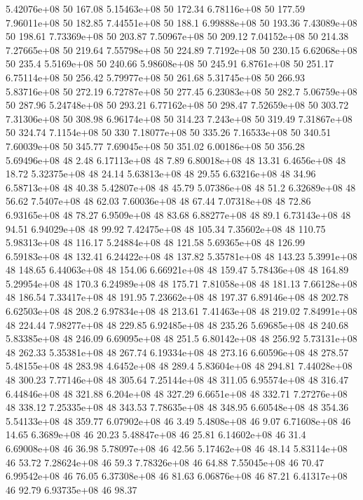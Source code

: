 5.42076e+08 50 167.08
5.15463e+08 50 172.34
6.78116e+08 50 177.59
7.96011e+08 50 182.85
7.44551e+08 50 188.1
6.99888e+08 50 193.36
7.43089e+08 50 198.61
7.73369e+08 50 203.87
7.50967e+08 50 209.12
7.04152e+08 50 214.38
7.27665e+08 50 219.64
7.55798e+08 50 224.89
7.7192e+08 50 230.15
6.62068e+08 50 235.4
5.5169e+08 50 240.66
5.98608e+08 50 245.91
6.8761e+08 50 251.17
6.75114e+08 50 256.42
5.79977e+08 50 261.68
5.31745e+08 50 266.93
5.83716e+08 50 272.19
6.72787e+08 50 277.45
6.23083e+08 50 282.7
5.06759e+08 50 287.96
5.24748e+08 50 293.21
6.77162e+08 50 298.47
7.52659e+08 50 303.72
7.31306e+08 50 308.98
6.96174e+08 50 314.23
7.243e+08 50 319.49
7.31867e+08 50 324.74
7.1154e+08 50 330
7.18077e+08 50 335.26
7.16533e+08 50 340.51
7.60039e+08 50 345.77
7.69045e+08 50 351.02
6.00186e+08 50 356.28
5.69496e+08 48 2.48
6.17113e+08 48 7.89
6.80018e+08 48 13.31
6.4656e+08 48 18.72
5.32375e+08 48 24.14
5.63813e+08 48 29.55
6.63216e+08 48 34.96
6.58713e+08 48 40.38
5.42807e+08 48 45.79
5.07386e+08 48 51.2
6.32689e+08 48 56.62
7.5407e+08 48 62.03
7.60036e+08 48 67.44
7.07318e+08 48 72.86
6.93165e+08 48 78.27
6.9509e+08 48 83.68
6.88277e+08 48 89.1
6.73143e+08 48 94.51
6.94029e+08 48 99.92
7.42475e+08 48 105.34
7.35602e+08 48 110.75
5.98313e+08 48 116.17
5.24884e+08 48 121.58
5.69365e+08 48 126.99
6.59183e+08 48 132.41
6.24422e+08 48 137.82
5.35781e+08 48 143.23
5.3991e+08 48 148.65
6.44063e+08 48 154.06
6.66921e+08 48 159.47
5.78436e+08 48 164.89
5.29954e+08 48 170.3
6.24989e+08 48 175.71
7.81058e+08 48 181.13
7.66128e+08 48 186.54
7.33417e+08 48 191.95
7.23662e+08 48 197.37
6.89146e+08 48 202.78
6.62503e+08 48 208.2
6.97834e+08 48 213.61
7.41463e+08 48 219.02
7.84991e+08 48 224.44
7.98277e+08 48 229.85
6.92485e+08 48 235.26
5.69685e+08 48 240.68
5.83385e+08 48 246.09
6.69095e+08 48 251.5
6.80142e+08 48 256.92
5.73131e+08 48 262.33
5.35381e+08 48 267.74
6.19334e+08 48 273.16
6.60596e+08 48 278.57
5.48155e+08 48 283.98
4.6452e+08 48 289.4
5.83604e+08 48 294.81
7.44028e+08 48 300.23
7.77146e+08 48 305.64
7.25144e+08 48 311.05
6.95574e+08 48 316.47
6.44846e+08 48 321.88
6.204e+08 48 327.29
6.6651e+08 48 332.71
7.27276e+08 48 338.12
7.25335e+08 48 343.53
7.78635e+08 48 348.95
6.60548e+08 48 354.36
5.54133e+08 48 359.77
6.07902e+08 46 3.49
5.4808e+08 46 9.07
6.71608e+08 46 14.65
6.3689e+08 46 20.23
5.48847e+08 46 25.81
6.14602e+08 46 31.4
6.69008e+08 46 36.98
5.78097e+08 46 42.56
5.17462e+08 46 48.14
5.83114e+08 46 53.72
7.28624e+08 46 59.3
7.78326e+08 46 64.88
7.55045e+08 46 70.47
6.99542e+08 46 76.05
6.37308e+08 46 81.63
6.06876e+08 46 87.21
6.41317e+08 46 92.79
6.93735e+08 46 98.37
